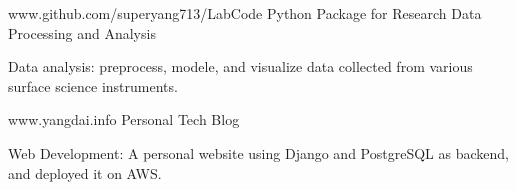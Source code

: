 


\begin{cventries}


\cventry
{www.github.com/superyang713/LabCode}
{Python Package for Research Data Processing and Analysis}
{}
{}
{
\begin{cvitems}
\item {Data analysis: preprocess, modele, and visualize data collected from
    various surface science instruments.}
\end{cvitems}
}


\cventry
{www.yangdai.info}
{Personal Tech Blog}
{}
{}
{
\begin{cvitems}
\item {Web Development: A personal website using Django and PostgreSQL as
    backend, and deployed it on AWS.}
\end{cvitems}
}


\end{cventries}



